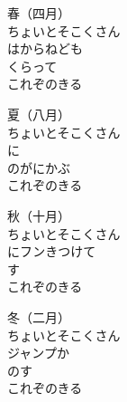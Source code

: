\documentclass[10pt,b5j]{tarticle} %
\begin{document}
\begin{enumerate} %
    \setlength{\itemindent}{\itemmargin}
    \begin{minipage}[c]{\blocksize}

        \vspace{\linespace}
        \item[春（四月）]~\\
        ちょいとそこくさん\\
        はからねども\\
        くらって\\
        これぞのきる
        
        \vspace{\linespace}
        \item[夏（八月）]~\\
        ちょいとそこくさん\\
        に\\
        のがにかぶ\\
        これぞのきる
        
    \end{minipage}
    \begin{minipage}[c]{\blocksize}

        \vspace{\linespace}
        \item[秋（十月）] ~\\
        ちょいとそこくさん\\
        にフンきつけて\\
        す\\
        これぞのきる
        
        \vspace{\linespace}
        \item[冬（二月）]~\\
        ちょいとそこくさん\\
        ジャンプか\\
        のす\\
        これぞのきる
        

\end{minipage}
\end{enumerate}
\end{document}
